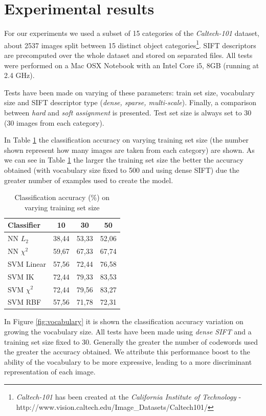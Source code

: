 \section{Experimental results}

For our experiments we used a subset of 15 categories of the \emph{Caltech-101} dataset, about 2537 images split between 15 distinct object categories\footnote{\emph{Caltech-101} has been created at the \emph{California Institute of Technology} - http://www.vision.caltech.edu/Image\_Datasets/Caltech101/}. SIFT descriptors are precomputed over the whole dataset and stored on separated files. All tests were performed on a Mac OSX Notebook with an Intel Core i5, 8GB (running at 2.4 GHz).

Tests have been made on varying of these parameters: train set size, vocabulary size and SIFT descriptor type (\emph{dense, sparse, multi-scale}). Finally, a comparison between \emph{hard} and \emph{soft assignment} is presented. Test set size is always set to 30 (30 images from each category).

In Table \ref{tab:trainsetsize} the classification accuracy on varying training set size (the number shown represent how many images are taken from each category) are shown. As we can see in Table \ref{tab:trainsetsize} the larger the training set size the better the accuracy obtained (with vocabulary size fixed to 500 and using dense SIFT) due the greater number of examples used to create the model.

\begin{table}[h]
\begin{center}
\begin{tabular}{|l|c|c|c|}
\hline
Classifier & 10 & 30 & 50\\
\hline\hline
NN $L_2$ & 38,44 & 53,33 & 52,06\\
NN $\chi^2$ & 59,67 & 67,33 & 67,74\\
SVM Linear & 57,56 & 72,44 & 76,58\\
SVM IK & 72,44 & 79,33 & 83,53\\
SVM $\chi^2$ & 72,44 & 79,56 & 83,27\\
SVM RBF & 57,56 & 71,78 & 72,31 \\
\hline
\end{tabular}
\end{center}
\label{tab:trainsetsize}
\caption{Classification accuracy (\%) on varying training set size}
\end{table}

In Figure \ref{fig:vocabulary} it is shown the classification accuracy variation on growing the vocabulary size. All tests have been made using \emph{dense SIFT} and a training set size fixed to 30. Generally the greater the number of codewords used the greater the accuracy obtained. We attribute this performance boost to the ability of the vocabulary to be more expressive, leading to a more discriminant representation of each image.

